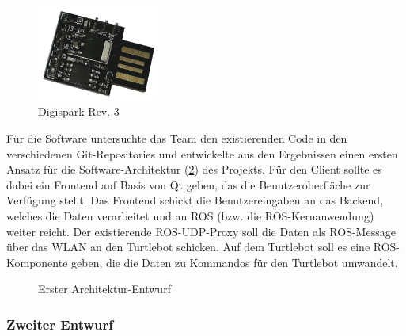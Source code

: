 \documentclass[a4paper,12pt,headsepline]{scrartcl}
\begin{document}
		\begin{figure}[H]
			\centering
			\includegraphics[width=4cm]{Images/digispark.png}
			\caption{Digispark Rev. 3}
			\label{fig:digispark}
		\end{figure}

		Für die Software untersuchte das Team den existierenden Code in den verschiedenen Git-Repositories und entwickelte aus den Ergebnissen einen ersten Ansatz für die Software-Architektur (\cref{fig:arch01}) des Projekts. Für den Client sollte es dabei ein Frontend auf Basis von Qt geben, das die Benutzeroberfläche zur Verfügung stellt. Das Frontend schickt die Benutzereingaben an das Backend, welches die Daten verarbeitet und an ROS (bzw. die ROS-Kernanwendung) weiter reicht. Der existierende ROS-UDP-Proxy soll die Daten als ROS-Message über das WLAN an den Turtlebot schicken. Auf dem Turtlebot soll es eine ROS-Komponente geben, die die Daten zu Kommandos für den Turtlebot umwandelt. 
		\begin{figure}[H]
			\centering
			\resizebox{\textwidth}{!}{}
			\caption{Erster Architektur-Entwurf}
			\label{fig:arch01}
		\end{figure}

	\subsubsection{Zweiter Entwurf} \label{sec:entwurf2}
\end{document}
